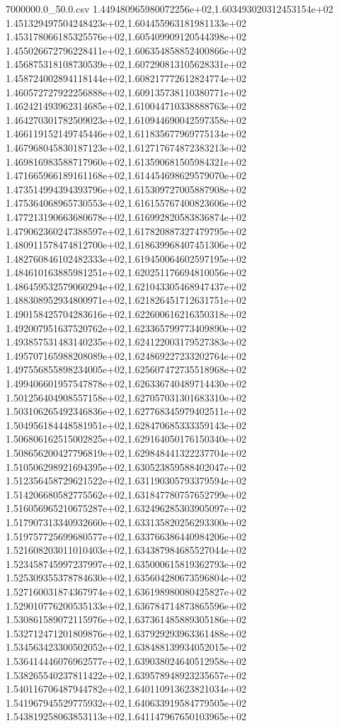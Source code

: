 \begin{filecontents*}{7000000.0_50.0.csv}
1.449480965980072256e+02,1.603493020312453154e+02
1.451329497504248423e+02,1.604455963181981133e+02
1.453178066185325576e+02,1.605409909120544398e+02
1.455026672796228411e+02,1.606354858852400866e+02
1.456875318108730539e+02,1.607290813105628331e+02
1.458724002894118144e+02,1.608217772612824774e+02
1.460572727922256888e+02,1.609135738110380771e+02
1.462421493962314685e+02,1.610044710338888763e+02
1.464270301782509023e+02,1.610944690042597358e+02
1.466119152149745446e+02,1.611835677969775134e+02
1.467968045830187123e+02,1.612717674872383213e+02
1.469816983588717960e+02,1.613590681505984321e+02
1.471665966189161168e+02,1.614454698629579070e+02
1.473514994394393796e+02,1.615309727005887908e+02
1.475364068965730553e+02,1.616155767400823606e+02
1.477213190663680678e+02,1.616992820583836874e+02
1.479062360247388597e+02,1.617820887327479795e+02
1.480911578474812700e+02,1.618639968407451306e+02
1.482760846102482333e+02,1.619450064602597195e+02
1.484610163885981251e+02,1.620251176694810056e+02
1.486459532579060294e+02,1.621043305468947437e+02
1.488308952934800971e+02,1.621826451712631751e+02
1.490158425704283616e+02,1.622600616216350318e+02
1.492007951637520762e+02,1.623365799773409890e+02
1.493857531483140235e+02,1.624122003179527383e+02
1.495707165988208089e+02,1.624869227233202764e+02
1.497556855898234005e+02,1.625607472735518968e+02
1.499406601957547878e+02,1.626336740489714430e+02
1.501256404908557158e+02,1.627057031301683310e+02
1.503106265492346836e+02,1.627768345979402511e+02
1.504956184448581951e+02,1.628470685333359143e+02
1.506806162515002825e+02,1.629164050176150340e+02
1.508656200427796819e+02,1.629848441322237704e+02
1.510506298921694395e+02,1.630523859588402047e+02
1.512356458729621522e+02,1.631190305793379594e+02
1.514206680582775562e+02,1.631847780757652799e+02
1.516056965210675287e+02,1.632496285303905097e+02
1.517907313340932660e+02,1.633135820256293300e+02
1.519757725699680577e+02,1.633766386440984206e+02
1.521608203011010403e+02,1.634387984685527044e+02
1.523458745997237997e+02,1.635000615819362793e+02
1.525309355378784630e+02,1.635604280673596804e+02
1.527160031874367974e+02,1.636198980080425827e+02
1.529010776200535133e+02,1.636784714873865596e+02
1.530861589072115976e+02,1.637361485889305186e+02
1.532712471201809876e+02,1.637929293963361488e+02
1.534563423300502052e+02,1.638488139934052015e+02
1.536414446076962577e+02,1.639038024640512958e+02
1.538265540237811422e+02,1.639578948923235657e+02
1.540116706487944782e+02,1.640110913623821034e+02
1.541967945529775932e+02,1.640633919584779505e+02
1.543819258063853113e+02,1.641147967650103965e+02

\end{filecontents*}
